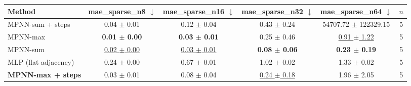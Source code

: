 \begin{tabular}{lccccc}
\toprule
Method & mae\_sparse\_n8 $\downarrow$ & mae\_sparse\_n16 $\downarrow$ & mae\_sparse\_n32 $\downarrow$ & mae\_sparse\_n64 $\downarrow$ & $n$ \\
\midrule
MPNN-sum + steps & 0.04 $\pm$ 0.01 & 0.12 $\pm$ 0.04 & 0.43 $\pm$ 0.24 & 54707.72 $\pm$ 122329.15 & 5 \\
MPNN-max & \textbf{0.01 $\pm$ 0.00} & \textbf{0.03 $\pm$ 0.01} & 0.25 $\pm$ 0.46 & \underline{0.91 $\pm$ 1.22} & 5 \\
MPNN-sum & \underline{0.02 $\pm$ 0.00} & \underline{0.03 $\pm$ 0.01} & \textbf{0.08 $\pm$ 0.06} & \textbf{0.23 $\pm$ 0.19} & 5 \\
MLP (flat adjacency) & 0.24 $\pm$ 0.00 & 0.67 $\pm$ 0.01 & 1.02 $\pm$ 0.02 & 1.33 $\pm$ 0.02 & 5 \\
\textbf{MPNN-max + steps} & 0.03 $\pm$ 0.01 & 0.08 $\pm$ 0.04 & \underline{0.24 $\pm$ 0.18} & 1.96 $\pm$ 2.05 & 5 \\
\bottomrule
\end{tabular}
